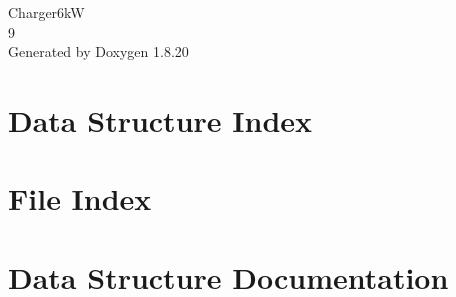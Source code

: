 \let\mypdfximage\pdfximage\def\pdfximage{\immediate\mypdfximage}\documentclass[twoside]{book}
\newcommand{\+}{\discretionary{\mbox{\scriptsize$\hookleftarrow$}}{}{}}
\newcommand{\clearemptydoublepage}{%
  \newpage{\pagestyle{empty}\cleardoublepage}%
}
\begin{document}
\hypersetup{pageanchor=false,
             bookmarksnumbered=true,
             pdfencoding=unicode
            }
\begin{titlepage}
\vspace*{7cm}
\begin{center}%
{\Large Charger6kW \\[1ex]\large 9 }\\
\vspace*{1cm}
{\large Generated by Doxygen 1.8.20}\\
\end{center}
\end{titlepage}
\clearemptydoublepage
{}
\tableofcontents
\clearemptydoublepage
{}
\hypersetup{pageanchor=true}

\chapter{Data Structure Index}

\chapter{File Index}

\chapter{Data Structure Documentation}



























































\end{document}
